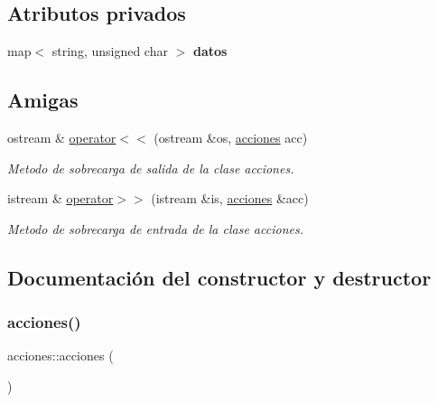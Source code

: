 \subsection*{Atributos privados}
\begin{DoxyCompactItemize}
\item 
\mbox{\label{classacciones_ae5c0afd871f11b000785a5d2f34c0ef8}} 
map$<$ string, unsigned char $>$ {\bfseries datos}
\end{DoxyCompactItemize}
\subsection*{Amigas}
\begin{DoxyCompactItemize}
\item 
ostream \& \hyperlink{classacciones_a9a915a3074a32755bbe797613e285ce8}{operator$<$$<$} (ostream \&os, \hyperlink{classacciones}{acciones} acc)
\begin{DoxyCompactList}\small\item\em Metodo de sobrecarga de salida de la clase acciones. \end{DoxyCompactList}\item 
istream \& \hyperlink{classacciones_ae247268e2c115cf0e1a078adbbfc04bc}{operator$>$$>$} (istream \&is, \hyperlink{classacciones}{acciones} \&acc)
\begin{DoxyCompactList}\small\item\em Metodo de sobrecarga de entrada de la clase acciones. \end{DoxyCompactList}\end{DoxyCompactItemize}


\subsection{Documentación del constructor y destructor}
\mbox{\label{classacciones_a557bc0964d2a7c1859b01f57303ecea0}} 
\subsubsection{\texorpdfstring{acciones()}{acciones()}\hspace{0.1cm}{\footnotesize\ttfamily [1/3]}}
{\footnotesize\ttfamily acciones\+::acciones (\begin{DoxyParamCaption}{ }\end{DoxyParamCaption})}



